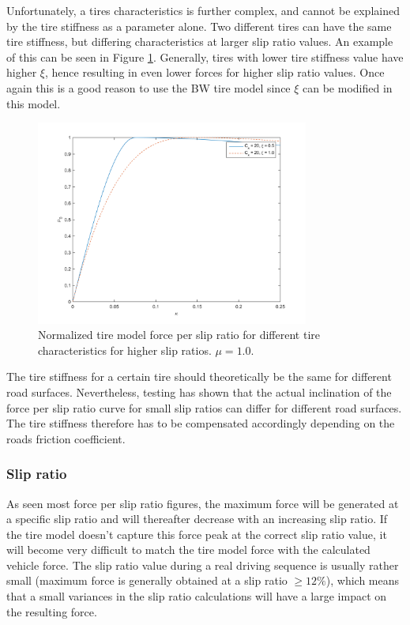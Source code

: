Unfortunately, a tires characteristics is further complex, and cannot be explained by the tire stiffness as a parameter alone. Two different tires can have the same tire stiffness, but differing characteristics at larger slip ratio values. An example of this can be seen in Figure \ref{different_xsi}. Generally, tires with lower tire stiffness value have higher $ \xi $, hence resulting in even lower forces for higher slip ratio values. Once again this is a good reason to use the BW tire model since $ \xi $ can be modified in this model.

\begin{figure}[h]
	\centering
	\includegraphics[width=0.8\textwidth]{Pictures/slipkraft_olika_xsi}
	\caption {Normalized tire model force per slip ratio for different tire characteristics for higher slip ratios.
		$ \mu = 1.0 $.}
	\label{different_xsi}
\end{figure}

The tire stiffness for a certain tire should theoretically be the same for different road surfaces. Nevertheless, testing has shown that the actual inclination of the force per slip ratio curve for small slip ratios can differ for different road surfaces. The tire stiffness therefore has to be compensated accordingly depending on the roads friction coefficient.

\subsubsection{Slip ratio}
As seen most force per slip ratio figures, the maximum force will be generated at a specific slip ratio and will thereafter decrease with an increasing slip ratio. If the tire model doesn't capture this force peak at the correct slip ratio value, it will become very difficult to match the tire model force with the calculated vehicle force. The slip ratio value during a real driving sequence is usually rather small (maximum force is generally obtained at a slip ratio $ \geq 12 \% $), which means that a small variances in the slip ratio calculations will have a large impact on the resulting force.

